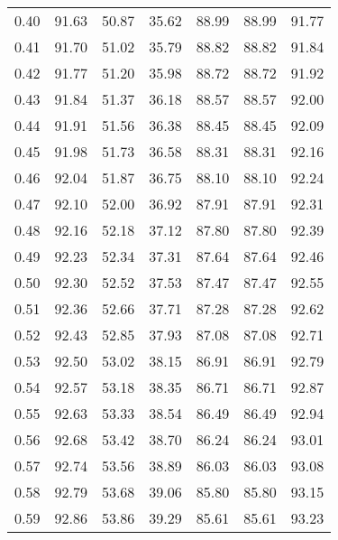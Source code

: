 \begin{tabular}{|c|c|c|c|c|c|c|}
      0.40 &     91.63 &     50.87 &      35.62 &   88.99 &      88.99 &         91.77 \\
      0.41 &     91.70 &     51.02 &      35.79 &   88.82 &      88.82 &         91.84 \\
      0.42 &     91.77 &     51.20 &      35.98 &   88.72 &      88.72 &         91.92 \\
      0.43 &     91.84 &     51.37 &      36.18 &   88.57 &      88.57 &         92.00 \\
      0.44 &     91.91 &     51.56 &      36.38 &   88.45 &      88.45 &         92.09 \\
      0.45 &     91.98 &     51.73 &      36.58 &   88.31 &      88.31 &         92.16 \\
      0.46 &     92.04 &     51.87 &      36.75 &   88.10 &      88.10 &         92.24 \\
      0.47 &     92.10 &     52.00 &      36.92 &   87.91 &      87.91 &         92.31 \\
      0.48 &     92.16 &     52.18 &      37.12 &   87.80 &      87.80 &         92.39 \\
      0.49 &     92.23 &     52.34 &      37.31 &   87.64 &      87.64 &         92.46 \\
      0.50 &     92.30 &     52.52 &      37.53 &   87.47 &      87.47 &         92.55 \\
      0.51 &     92.36 &     52.66 &      37.71 &   87.28 &      87.28 &         92.62 \\
      0.52 &     92.43 &     52.85 &      37.93 &   87.08 &      87.08 &         92.71 \\
      0.53 &     92.50 &     53.02 &      38.15 &   86.91 &      86.91 &         92.79 \\
      0.54 &     92.57 &     53.18 &      38.35 &   86.71 &      86.71 &         92.87 \\
      0.55 &     92.63 &     53.33 &      38.54 &   86.49 &      86.49 &         92.94 \\
      0.56 &     92.68 &     53.42 &      38.70 &   86.24 &      86.24 &         93.01 \\
      0.57 &     92.74 &     53.56 &      38.89 &   86.03 &      86.03 &         93.08 \\
      0.58 &     92.79 &     53.68 &      39.06 &   85.80 &      85.80 &         93.15 \\
      0.59 &     92.86 &     53.86 &      39.29 &   85.61 &      85.61 &         93.23 \\

\end{tabular}
